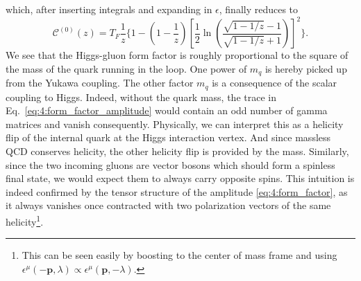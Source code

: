 which, after inserting integrals and expanding in $\epsilon$, finally reduces to
\begin{equation}
\mathcal{C}^{(0)}(z) = T_F \frac{1}{z} \bigg \lbrace 1 - \left(1 - \frac{1}{z} \right) \left[ \frac{1}{2} \ln\! \left( \frac{\sqrt{1 - 1/z} - 1}{\sqrt{1 - 1/z} + 1} \right) \right]^2 \bigg \rbrace.
\end{equation}
We see that the Higgs-gluon form factor is roughly proportional to the square of the mass of the quark running in the loop. One power of $m_q$ is hereby picked up from the Yukawa coupling. The other factor $m_q$ is a consequence of the scalar coupling to Higgs. Indeed, without the quark mass, the trace in Eq.~\eqref{eq:4:form_factor_amplitude} would contain an odd number of gamma matrices and vanish consequently. Physically, we can interpret this as a helicity flip of the internal quark at the Higgs interaction vertex. And since massless \acs{QCD} conserves helicity, the other helicity flip is provided by the mass. Similarly, since the two incoming gluons are vector bosons which should form a spinless final state, we would expect them to always carry opposite spins. This intuition is indeed confirmed by the tensor structure of the amplitude \eqref{eq:4:form_factor}, as it always vanishes once contracted with two polarization vectors of the same helicity\footnote{This can be seen easily by boosting to the center of mass frame and using $\epsilon^\mu (-\mathbf{p}, \lambda) \propto \epsilon^\mu (\mathbf{p}, -\lambda)$.}.

